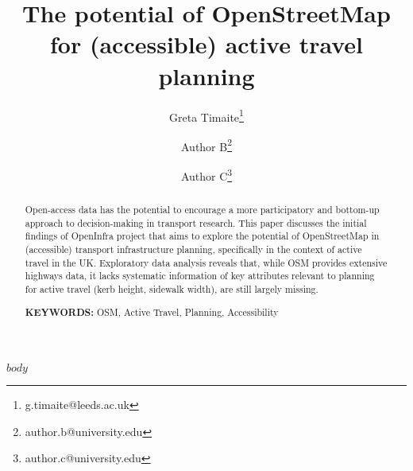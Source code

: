 \documentclass[11pt]{article}
\title{The potential of OpenStreetMap for (accessible) active travel planning}
\author[1]{Greta Timaite\thanks{g.timaite@leeds.ac.uk}}
\author[1]{Author B\thanks{author.b@university.edu}}
\author[2]{Author C\thanks{author.c@university.edu}}
\affil[1]{Leeds Institute for Data Analytics, University of Leeds}
\affil[2]{Department of Mechanical Engineering, \LaTeX\ University}
\begin{document}
\maketitle


\begin{abstract}
\centering

Open-access data has the potential to encourage a more participatory and bottom-up approach to decision-making in transport research. This paper discusses the initial findings of OpenInfra project that aims to explore the potential of OpenStreetMap in (accessible) transport infrastructure planning, specifically in the context of active travel in the UK. Exploratory data analysis reveals that, while OSM provides extensive highways data, it lacks systematic information of key attributes relevant to planning for active travel (kerb height, sidewalk width), are still largely missing.  \textit{}


{\bf KEYWORDS:} OSM, Active Travel, Planning, Accessibility \textit{}

\end{abstract}


$body$
\end{document}
